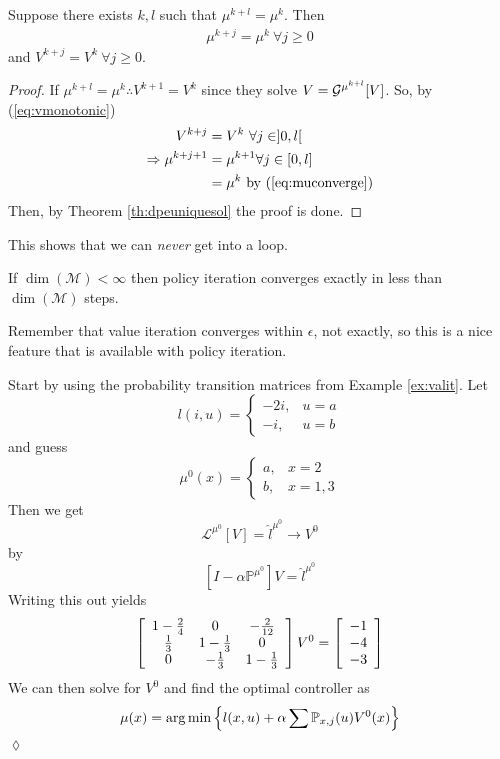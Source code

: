 \begin{theorem}
Suppose there exists $k,l$ such that $\mu^{k+l} = \mu^k$. Then
\begin{align}
\label{eq:muconverge}
\mu^{k+j}=\mu^k ~\forall j\geq 0
\end{align}
and $V^{k+j}=V^k ~\forall j\geq0$.
\end{theorem}

\begin{proof}
If $\mu^{k+l}=\mu^k \therefore V^{k+1}=V^k$ since they solve $V=\mathcal{G}^{\mu^{k+l}}[V]$. So, by (\ref{eq:vmonotonic})
\begin{align*}
V^{k+j} &= V^k ~\forall j\in ]0,l[ \\
\Rightarrow \mu^{k+j+1} &= \mu^{k+1} \forall j\in [0,l] \\
&= \mu^k \text{ by (\ref{eq:muconverge})}
\end{align*}
Then, by Theorem \ref{th:dpeuniquesol} the proof is done.
\end{proof}
This shows that we can \textit{never} get into a loop.

\begin{corollary}
If $\dim(\mathcal{M})<\infty$ then policy iteration converges exactly in less than $\dim(\mathcal{M})$ steps.
\end{corollary}

Remember that value iteration converges within $\epsilon$, not exactly, so this is a nice feature that is available with policy iteration.

\begin{example}
Start by using the probability transition matrices from Example \ref{ex:valit}. Let
$$l(i,u) = \begin{cases} -2i, & u=a \\ -i, & u=b \end{cases}$$
and guess
$$\mu^0(x) = \begin{cases} a, & x=2 \\ b, & x=1,3 \end{cases}$$
Then we get
$$\mathcal{L}^{\mu^0}[V]=\hat{l}^{\mu^0} \to V^0$$
by
$$[I-\alpha\mathbb{P}^{\mu^0}]V=\hat{l}^{\mu^0}$$
Writing this out yields
\begin{align}
\left[\begin{array}{c c c}
1-\frac{2}{4} & 0 & -\frac{2}{12} \\
\frac{1}{3} & 1-\frac{1}{3} & 0 \\
0 & -\frac{1}{3} & 1-\frac{1}{3}
\end{array}\right] V^0 =
\left[\begin{array}{c}
-1 \\ -4 \\ -3
\end{array}\right]
\end{align}
We can then solve for $V^0$ and find the optimal controller as
$$\mu(x) = \arg\min\left\lbrace l(x,u)+\alpha\sum\mathbb{P}_{x,j}(u)V^0(x)\right\rbrace$$
$\lozenge$
\end{example}


% 

